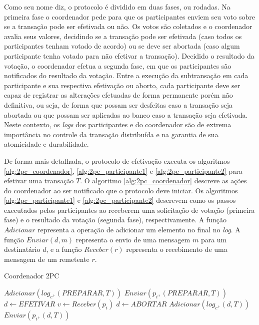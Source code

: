 \documentclass[11pt,twoside,a4paper]{book}
\begin{document}
Como seu nome diz, o protocolo é dividido em duas fases, ou rodadas. Na primeira fase o coordenador pede para que os participantes enviem seu voto sobre se a transação pode ser efetivada ou não. Os votos são coletados e o coordenador avalia seus valores, decidindo se a transação pode ser efetivada (caso todos os participantes tenham votado de acordo) ou se deve ser abortada (caso algum participante tenha votado para não efetivar a transação). Decidido o resultado da votação, o coordenador efetua a segunda fase, em que os participantes são notificados do resultado da votação. Entre a execução da subtransação em cada participante e sua respectiva efetivação ou aborto, cada participante deve ser capaz de registrar as alterações efetuadas de forma permanente porém não definitiva, ou seja, de forma que possam ser desfeitas caso a transação seja abortada ou que possam ser aplicadas ao banco caso a transação seja efetivada. Neste contexto, os \emph{logs} dos participantes e do coordenador são de extrema importância no controle da transação distribuída e na garantia de sua atomicidade e durabilidade.

De forma mais detalhada, o protocolo de efetivação executa os algoritmos \ref{alg:2pc_coordenador}, \ref{alg:2pc_participante1} e \ref{alg:2pc_participante2} para efetivar uma transação $T$. O algoritmo \ref{alg:2pc_coordenador} descreve as ações do coordenador ao ser notificado que o protocolo deve iniciar. Os algoritmos \ref{alg:2pc_participante1} e \ref{alg:2pc_participante2} descrevem como os passos executados pelos participantes ao receberem uma solicitação de votação (primeira fase) e o resultado da votação (segunda fase), respectivamente. A função $Adicionar$ representa a operação de adicionar um elemento no final no \emph{log}. A função $Enviar(d, m)$ representa o envio de uma mensagem $m$ para um destinatário $d$, e a função $Receber(r)$ representa o recebimento de uma mensagem de um remetente $r$.

\begin{algorithm}
\caption{Coordenador 2PC}
\label{alg:2pc_coordenador}
\begin{algorithmic}[1]
\State $Adicionar(log_c, (PREPARAR, T))$
	\State $Enviar(p_i, (PREPARAR, T))$
\EndFor
\State $d \gets EFETIVAR$
	\State $v \gets Receber(p_i)$
		\State $d \gets ABORTAR$
	\EndIf
\EndFor
\State $Adicionar(log_c, (d, T))$
	\State $Enviar(p_i, (d, T))$
\EndFor
\end{algorithmic}
\end{algorithm}
\end{document}
